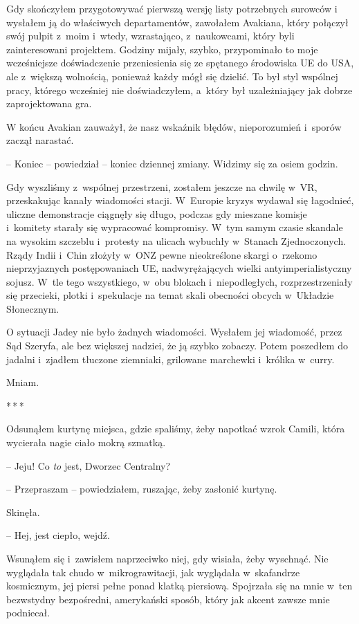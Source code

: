 \documentclass[oneside,polish,12pt,sfheadings]{mwbk}
\newcommand{\threeast}{\bigskip\par\centerline{*\,*\,*}\medskip\par}%
\begin{document}
Gdy skończyłem przygotowywać pierwszą wersję listy potrzebnych surowców
i wysłałem ją do właściwych departamentów, zawołałem Avakiana, który
połączył swój pulpit z~moim i~wtedy, wzrastająco, z~naukowcami, który
byli zainteresowani projektem. Godziny mijały, szybko, przypominało to
moje wcześniejsze doświadczenie przeniesienia się ze spętanego
środowiska UE do USA, ale z~większą wolnością, ponieważ każdy mógł się
dzielić. To był styl wspólnej pracy, którego wcześniej nie
doświadczyłem, a~który był uzależniający jak dobrze zaprojektowana gra.

W końcu Avakian zauważył, że nasz wskaźnik błędów, nieporozumień i~sporów zaczął narastać.

-- Koniec -- powiedział -- koniec dziennej zmiany. Widzimy się za osiem
godzin.

Gdy wyszliśmy z~wspólnej przestrzeni, zostałem jeszcze na chwilę w~VR,
przeskakując kanały wiadomości stacji. W~Europie kryzys wydawał się
łagodnieć, uliczne demonstracje ciągnęły się długo, podczas gdy mieszane
komisje i~komitety starały się wypracować kompromisy. W~tym samym czasie
skandale na wysokim szczeblu i~protesty na ulicach wybuchły w~Stanach
Zjednoczonych. Rządy Indii i~Chin złożyły w~ONZ pewne nieokreślone
skargi o~rzekomo nieprzyjaznych postępowaniach UE, nadwyrężających
wielki antyimperialistyczny sojusz. W~tle tego wszystkiego, w~obu
blokach i~niepodległych, rozprzestrzeniały się przecieki, plotki i~spekulacje na temat skali obecności obcych w~Układzie Słonecznym.

O sytuacji Jadey nie było żadnych wiadomości. Wysłałem jej wiadomość,
przez Sąd Szeryfa, ale bez większej nadziei, że ją szybko zobaczy. Potem
poszedłem do jadalni i~zjadłem tłuczone ziemniaki, grilowane marchewki i~królika w~curry.

Mniam.

\threeast

Odsunąłem kurtynę miejsca, gdzie spaliśmy, żeby napotkać wzrok Camili,
która wycierała nagie ciało mokrą szmatką.

-- Jeju! Co \emph{to} jest, Dworzec Centralny?

-- Przepraszam -- powiedziałem, ruszając, żeby zasłonić kurtynę.

Skinęła. 

-- Hej, jest ciepło, wejdź.

Wsunąłem się i~zawisłem naprzeciwko niej, gdy wisiała, żeby wyschnąć.
Nie wyglądała tak chudo w~mikrograwitacji, jak wyglądała w~skafandrze
kosmicznym, jej piersi pełne ponad klatką piersiową. Spojrzała się na
mnie w~ten bezwstydny bezpośredni, amerykański sposób, który jak akcent
zawsze mnie podniecał.
\end{document}
